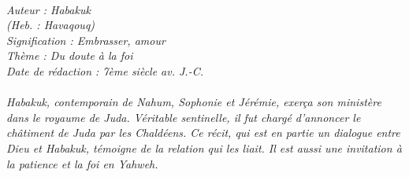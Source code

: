 \BFont
\noindent\hrulefill
{\footnotesize
\textit{
\bigskip
{\centering{}
\\Auteur : Habakuk
\\(Heb. : Havaqouq)
\\Signification : Embrasser, amour
\\Thème : Du doute à la foi
\\Date de rédaction : 7ème siècle av. J.-C.\\}
}
\textit{
\\Habakuk, contemporain de Nahum, Sophonie et Jérémie, exerça son ministère dans le royaume de Juda. Véritable sentinelle, il fut chargé d’annoncer le châtiment de Juda par les Chaldéens. Ce récit, qui est en partie un dialogue entre Dieu et Habakuk, témoigne de la relation qui les liait. Il est aussi une invitation à la patience et la foi en Yahweh.\bigskip
}
}
\par\nobreak\noindent\hrulefill
